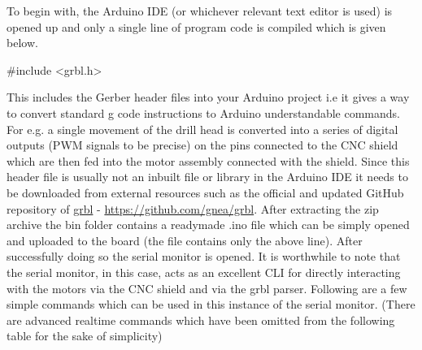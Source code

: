 To begin with, the Arduino IDE (or whichever relevant text editor is used) is opened up and only a single line of program code is compiled which is given below.

 {\selectfont \#include <grbl.h>}

This includes the Gerber header files into your Arduino project i.e it gives a way to convert standard g code instructions to Arduino understandable commands. For e.g. a single movement of the drill head is converted into a series of digital outputs (PWM signals to be precise) on the pins connected to the CNC shield which are then fed into the motor assembly connected with the shield. Since this header file is usually not an inbuilt file or library in the Arduino IDE it needs to be downloaded from external resources such as the official and updated GitHub repository of \href{https://github.com/gnea/grbl}{grbl} - \url{https://github.com/gnea/grbl}. After extracting the zip archive the bin folder contains a readymade .ino file which can be simply opened and uploaded to the board (the file contains only the above line). After successfully doing so the serial monitor is opened. It is worthwhile to note that the serial monitor, in this case, acts as an excellent CLI for directly interacting with the motors via the CNC shield and via the grbl parser. Following are a few simple commands which can be used in this instance of the serial monitor. (There are advanced realtime commands which have been omitted from the following table for the sake of simplicity) \par

